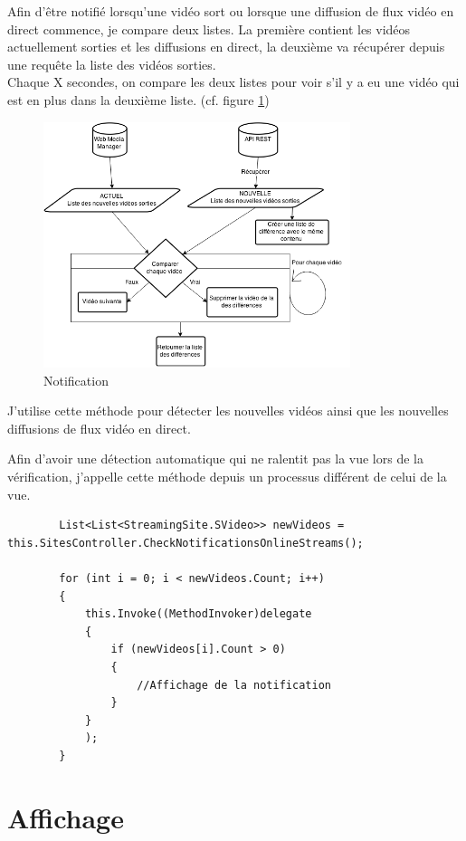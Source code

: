 \documentclass[11pt]{report} %
\begin{document}
	Afin d'être notifié lorsqu'une vidéo sort ou lorsque une diffusion de flux vidéo en direct commence, je compare deux listes. La première contient les vidéos actuellement sorties et les diffusions en direct, la deuxième va récupérer depuis une requête la liste des vidéos sorties. \\
	Chaque X secondes, on compare les deux listes pour voir s'il y a eu une vidéo qui est en plus dans la deuxième liste. (cf. figure \ref{checkNotif})
	
	\begin{figure}[h]
		\center
		\includegraphics[width=0.8\textwidth]{../img/notification.png}
		\caption{Notification}
		\label{checkNotif}
	\end{figure}
	
	J'utilise cette méthode pour détecter les nouvelles vidéos ainsi que les nouvelles diffusions de flux vidéo en direct.
	
	Afin d'avoir une détection automatique qui ne ralentit pas la vue lors de la vérification, j'appelle cette méthode depuis un processus différent de celui de la vue.
	
	\begin{lstlisting}
		List<List<StreamingSite.SVideo>> newVideos = this.SitesController.CheckNotificationsOnlineStreams();
		
		for (int i = 0; i < newVideos.Count; i++)
		{
			this.Invoke((MethodInvoker)delegate
			{
				if (newVideos[i].Count > 0)
				{
					//Affichage de la notification
				}	
			}
			);
		}
	\end{lstlisting}
	
	\newpage
	\section{Affichage}	
\end{document}
